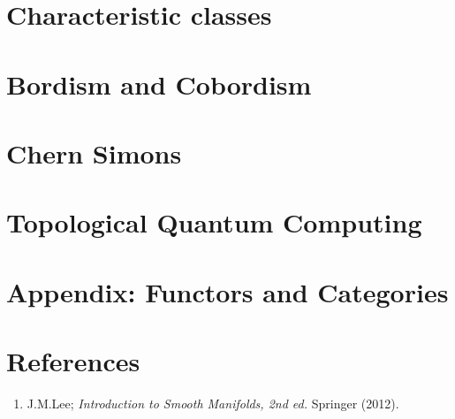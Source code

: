 \documentclass[a4paper]{article}
\theoremstyle{definition} \newtheorem*{definition}{Definition}
\theoremstyle{definition} \newtheorem*{definitions}{Definitions}
\theoremstyle{plain} \newtheorem{theorem}{Theorem}[section]
\theoremstyle{plain} \newtheorem{proposition}[theorem]{Proposition}
\theoremstyle{plain} \newtheorem{corollary}[theorem]{Corollary}
\theoremstyle{plain} \newtheorem{lemma}[theorem]{Lemma}
\theoremstyle{plain} \newtheorem{example}[theorem]{Example}
\begin{document}
\section{Characteristic classes}

\section{Bordism and Cobordism}

\section{Chern Simons}

\section{Topological Quantum Computing}

\section{Appendix: Functors and Categories}

\section*{References}
\begin{enumerate}
\item J.M.Lee; \textit{Introduction to Smooth Manifolds, 2nd ed.} Springer (2012).
\end{enumerate}
\end{document}
